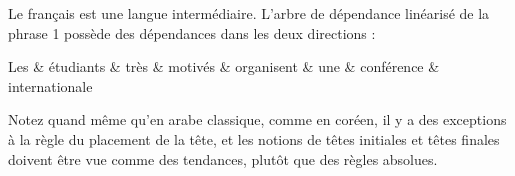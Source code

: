 {%

    Le français est une langue intermédiaire. L’arbre de dépendance linéarisé de la phrase 1 possède des dépendances dans les deux directions :
    
    \ea
    \begin{dependency}[font=\normalfont\itshape,arc edge, arc angle=80, text only label, label style={above}]
    \begin{deptext}
    Les \& étudiants \& très \& motivés \& organisent \& une \& conférence \& internationale\\
    \end{deptext}
    \end{dependency}    
    \z


    Notez quand même qu’en arabe classique, comme en coréen, il y a des exceptions à la règle du placement de la tête, et les notions de têtes initiales et têtes finales doivent être vue comme des tendances, plutôt que des règles absolues.
}
